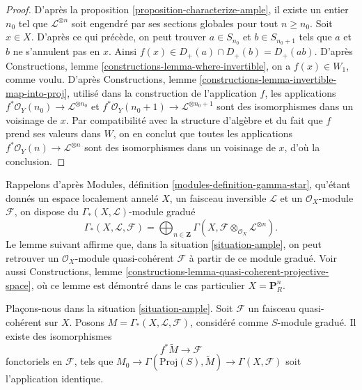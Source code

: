 \begin{proof}
D'après la proposition \ref{proposition-characterize-ample}, il existe un entier
$n_0$ tel que $\mathcal{L}^{\otimes n}$ soit engendré par ses sections globales pour tout
$n \geq n_0$. Soit $x \in X$. D'après ce qui précède, on peut trouver
$a \in S_{n_0}$ et $b \in S_{n_0 + 1}$ tels que
$a$ et $b$ ne s'annulent pas en $x$. Ainsi
$f(x) \in D_{+}(a) \cap D_{+}(b) = D_{+}(ab)$.
D'après Constructions, lemme \ref{constructions-lemma-where-invertible},
on a $f(x) \in W_1$, comme voulu.
D'après Constructions, lemme \ref{constructions-lemma-invertible-map-into-proj},
utilisé dans la construction de l'application $f$,
les applications
$f^*\mathcal{O}_Y(n_0) \to \mathcal{L}^{\otimes n_0}$ et
$f^*\mathcal{O}_Y(n_0 + 1) \to \mathcal{L}^{\otimes n_0 + 1}$
sont des isomorphismes dans un voisinage de $x$. Par compatibilité
avec la structure d'algèbre et du fait que $f$ prend ses valeurs dans $W$,
on en conclut que toutes les applications
$f^*\mathcal{O}_Y(n) \to \mathcal{L}^{\otimes n}$ sont des
isomorphismes dans un voisinage de $x$, d'où la conclusion.
\end{proof}

\noindent
Rappelons d'après Modules, définition \ref{modules-definition-gamma-star},
qu'étant donnés un espace localement annelé $X$, un faisceau inversible $\mathcal{L}$ et
un $\mathcal{O}_X$-module $\mathcal{F}$, on dispose du
$\Gamma_*(X, \mathcal{L})$-module gradué
$$
\Gamma_*(X, \mathcal{L}, \mathcal{F}) =
\bigoplus\nolimits_{n \in \mathbf{Z}}
\Gamma(X, \mathcal{F} \otimes_{\mathcal{O}_X} \mathcal{L}^{\otimes n}).
$$
Le lemme suivant affirme que, dans la situation \ref{situation-ample},
on peut retrouver un $\mathcal{O}_X$-module quasi-cohérent $\mathcal{F}$
à partir de ce module gradué. Voir aussi
Constructions, lemme \ref{constructions-lemma-quasi-coherent-projective-space},
où ce lemme est démontré dans le cas particulier $X = \mathbf{P}^n_R$.

\begin{lemma}
\label{lemma-ample-quasi-coherent}
Plaçons-nous dans la situation \ref{situation-ample}.
Soit $\mathcal{F}$ un faisceau quasi-cohérent sur $X$.
Posons $M = \Gamma_*(X, \mathcal{L}, \mathcal{F})$, considéré comme $S$-module
gradué. Il existe des isomorphismes
$$
f^*\widetilde{M} \longrightarrow \mathcal{F}
$$
fonctoriels en $\mathcal{F}$, tels que
$M_0 \to \Gamma(\text{Proj}(S), \widetilde{M}) \to \Gamma(X, \mathcal{F})$
soit l'application identique.
\end{lemma}

